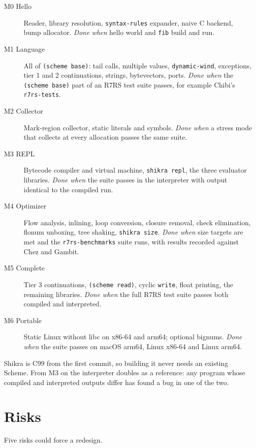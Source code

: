 \documentclass[a4paper,11pt]{article}
\begin{document}
\begin{description}
\item[M0 Hello] Reader, library resolution, \texttt{syntax-rules} expander,
  naive C backend, bump allocator. \emph{Done when} hello world and
  \texttt{fib} build and run.
\item[M1 Language] All of \texttt{(scheme base)}: tail calls, multiple
  values, \texttt{dynamic-wind}, exceptions, tier 1 and 2 continuations,
  strings, bytevectors, ports. \emph{Done when} the \texttt{(scheme base)}
  part of an R7RS test suite passes, for example Chibi's
  \texttt{r7rs-tests}.
\item[M2 Collector] Mark-region collector, static literals and symbols.
  \emph{Done when} a stress mode that collects at every allocation passes
  the same suite.
\item[M3 REPL] Bytecode compiler and virtual machine, \texttt{shikra repl},
  the three evaluator libraries. \emph{Done when} the suite passes in the
  interpreter with output identical to the compiled run.
\item[M4 Optimizer] Flow analysis, inlining, loop conversion, closure
  removal, check elimination, flonum unboxing, tree shaking,
  \texttt{shikra size}. \emph{Done when} size targets are met and the
  \texttt{r7rs-benchmarks} suite runs, with results recorded against Chez
  and Gambit.
\item[M5 Complete] Tier 3 continuations, \texttt{(scheme read)}, cyclic
  \texttt{write}, float printing, the remaining libraries. \emph{Done when}
  the full R7RS test suite passes both compiled and interpreted.
\item[M6 Portable] Static Linux without libc on x86-64 and arm64; optional
  bignums. \emph{Done when} the suite passes on macOS arm64, Linux x86-64
  and Linux arm64.
\end{description}

Shikra is C99 from the first commit, so building it never needs an existing
Scheme. From M3 on the interpreter doubles as a reference: any program whose
compiled and interpreted outputs differ has found a bug in one of the two.

\section{Risks}

Five risks could force a redesign.
\end{document}
